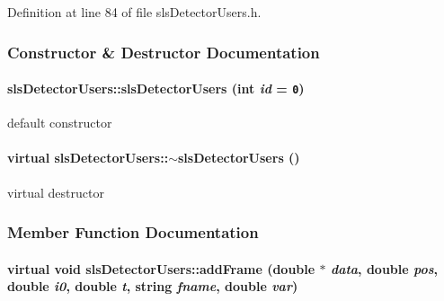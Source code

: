 Definition at line 84 of file sls\-Detector\-Users.h.

\subsubsection{Constructor \& Destructor Documentation}
\hypertarget{classslsDetectorUsers_17323cd635b9e5c2916be3ca30ec748c}{
\paragraph[slsDetectorUsers]{\setlength{\rightskip}{0pt plus 5cm}sls\-Detector\-Users::sls\-Detector\-Users (int {\em id} = {\tt 0})}\hfill}
\label{classslsDetectorUsers_17323cd635b9e5c2916be3ca30ec748c}


default constructor 

\hypertarget{classslsDetectorUsers_0d1daf6539befe56d6e3df0b24f5d68b}{
\paragraph[$\sim$slsDetectorUsers]{\setlength{\rightskip}{0pt plus 5cm}virtual sls\-Detector\-Users::$\sim$sls\-Detector\-Users ()}\hfill}
\label{classslsDetectorUsers_0d1daf6539befe56d6e3df0b24f5d68b}


virtual destructor 



\subsubsection{Member Function Documentation}
\hypertarget{classslsDetectorUsers_5128e295a5b926ccabdb48083d324789}{
\paragraph[addFrame]{\setlength{\rightskip}{0pt plus 5cm}virtual void sls\-Detector\-Users::add\-Frame (double $\ast$ {\em data}, double {\em pos}, double {\em i0}, double {\em t}, string {\em fname}, double {\em var})}\hfill}
\label{classslsDetectorUsers_5128e295a5b926ccabdb48083d324789}


